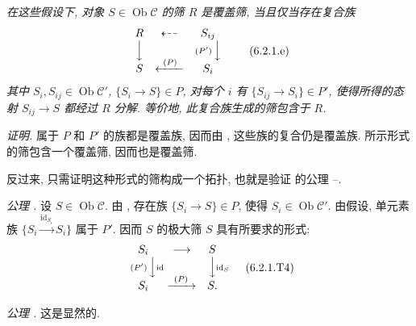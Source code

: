 \textit{在这些假设下, 对象 \(S\in\operatorname{Ob}\mathscr C\) 的筛 \(R\)
是覆盖筛, 当且仅当存在复合族}
\[
\begin{array}{ccccc}
  R & \dashleftarrow & S_{ij}\\
  \Big\downarrow & & \scriptstyle(P')\,\Big\downarrow\\[-0.25em]
  S & \xleftarrow{\ (P)\ } & S_i
\end{array}
\tag{6.2.1.e}\label{sga3:iv:proposition:6:2:1:eq:6:2:1:e:01}
\]
\textit{其中 \(S_i,S_{ij}\in\operatorname{Ob}\mathscr C'\),
\(\{S_i\to S\}\in P\), 对每个 \(i\) 有 \(\{S_{ij}\to S_i\}\in P'\),
使得所得的态射 \(S_{ij}\to S\) 都经过 \(R\) 分解.
等价地, 此复合族生成的筛包含于 \(R\).}

\smallskip
\noindent\textit{证明.}
属于 \(P\) 和 \(P'\) 的族都是覆盖族, 因而由
,
这些族的复合仍是覆盖族. 所示形式的筛包含一个覆盖筛, 因而也是覆盖筛.

反过来, 只需证明这种形式的筛构成一个拓扑,
也就是验证  的公理
--.

\smallskip
\noindent\textit{公理 .}
设 \(S\in\operatorname{Ob}\mathscr C\).
由 ,
存在族 \(\{S_i\to S\}\in P\), 使得 \(S_i\in\operatorname{Ob}\mathscr C'\).
由假设, 单元素族 \(\{S_i\xrightarrow{\operatorname{id}_{S_i}}S_i\}\)
属于 \(P'\). 因而 \(S\) 的极大筛 \(S\) 具有所要求的形式:
\[
\begin{array}{ccc}
  S_i & \longrightarrow & S\\
  \scriptstyle(P')\,\Big\downarrow\rlap{\(\scriptstyle\operatorname{id}\)}
      & & \Big\downarrow\rlap{\(\scriptstyle\operatorname{id}_S\)}\\[-0.25em]
  S_i & \xrightarrow{\ (P)\ } & S .
\end{array}
\tag{6.2.1.T4}\label{sga3:iv:proposition:6:2:1:eq:6:2:1:t4:01}
\]

\smallskip
\noindent\textit{公理 .}
这是显然的.

